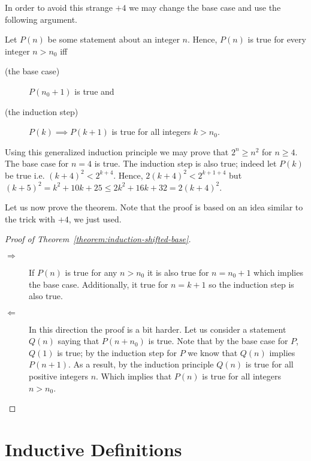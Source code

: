 In order to avoid this strange $+4$ we may change the base
case and use the following argument.

\begin{theorem}
\label{theorem:induction-shifted-base}
    Let $P(n)$ be some statement about an integer $n$.
    Hence, $P(n)$ is true for every integer $n > n_0$ iff
    \begin{description}
        \item [(the base case)] $P(n_0 + 1)$ is true and
        \item [(the induction step)] $P(k) \implies P(k + 1)$ is true for all
            integers $k > n_0$.
    \end{description}
\end{theorem}

Using this generalized induction principle we may prove that $2^n \ge n^2$ for
$n \ge 4$. The base case for $n = 4$ is true. The induction step is also true;
indeed let $P(k)$ be true i.e. $(k + 4)^2 < 2^{k + 4}$. Hence,
$2(k + 4)^2 < 2^{k + 1 + 4}$ but
$(k + 5)^2 = k^2 + 10k + 25 \le 2k^2 + 16k + 32 = 2(k + 4)^2$.

Let us now prove the theorem. Note that the proof is based on an idea similar
to the trick with $+4$, we just used.
\begin{proof}[Proof of Theorem~\ref{theorem:induction-shifted-base}]
    \begin{description}
        \item[$\Rightarrow$] If $P(n)$ is true for any $n > n_0$ it is also true
            for $n = n_0 + 1$ which implies the base case. Additionally, it true for
            $n = k + 1$ so the induction step is also true.
        \item[$\Leftarrow$] In this direction the proof is a bit harder. Let us
            consider a statement $Q(n)$ saying that $P(n + n_0)$ is true. Note that
            by the base case for $P$, $Q(1)$ is true; by the induction step for $P$
            we know that $Q(n)$ implies $P(n + 1)$. As a result, by the induction
            principle $Q(n)$ is true for all positive integers $n$. Which implies
            that $P(n)$ is true for all integers $n > n_0$.
    \end{description}
\end{proof}

\section{Inductive Definitions}

